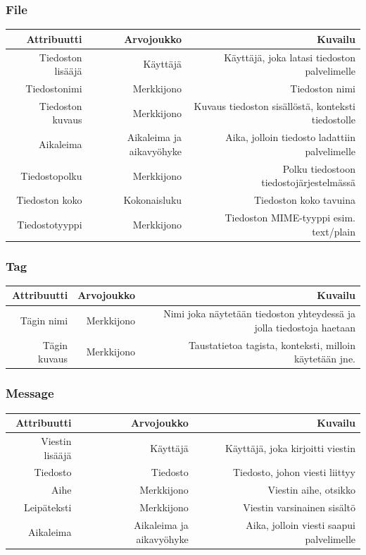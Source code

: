 \documentclass[10pt,a4paper]{article}
\begin{document}
\subsubsection{File}
\begin{tabularx}{\textwidth}{|R|R|R|} \hline
\textbf{Attribuutti} & \textbf{Arvojoukko} & \textbf{Kuvailu}\\ \hline
Tiedoston lisääjä & Käyttäjä & Käyttäjä, joka latasi tiedoston palvelimelle\\ \hline
Tiedostonimi & Merkkijono & Tiedoston nimi\\ \hline
Tiedoston kuvaus & Merkkijono & Kuvaus tiedoston sisällöstä, konteksti tiedostolle\\ \hline
Aikaleima & Aikaleima ja aikavyöhyke & Aika, jolloin tiedosto ladattiin palvelimelle\\ \hline
Tiedostopolku & Merkkijono & Polku tiedostoon tiedostojärjestelmässä\\ \hline
Tiedoston koko & Kokonaisluku & Tiedoston koko tavuina\\ \hline
Tiedostotyyppi & Merkkijono & Tiedoston MIME-tyyppi esim. text/plain\\ \hline
\end{tabularx}

\subsubsection{Tag}
\begin{tabularx}{\textwidth}{|R|R|R|} \hline
\textbf{Attribuutti} & \textbf{Arvojoukko} & \textbf{Kuvailu}\\ \hline
Tägin nimi & Merkkijono & Nimi joka näytetään tiedoston yhteydessä ja jolla tiedostoja haetaan\\ \hline
Tägin kuvaus & Merkkijono & Taustatietoa tagista, konteksti, milloin käytetään jne.\\ \hline
\end{tabularx}

\subsubsection{Message}
\begin{tabularx}{\textwidth}{|R|R|R|} \hline
\textbf{Attribuutti} & \textbf{Arvojoukko} & \textbf{Kuvailu}\\ \hline
Viestin lisääjä & Käyttäjä & Käyttäjä, joka kirjoitti viestin\\ \hline
Tiedosto & Tiedosto & Tiedosto, johon viesti liittyy\\ \hline
Aihe & Merkkijono & Viestin aihe, otsikko\\ \hline
Leipäteksti & Merkkijono & Viestin varsinainen sisältö\\ \hline
Aikaleima & Aikaleima ja aikavyöhyke & Aika, jolloin viesti saapui palvelimelle\\ \hline
\end{tabularx}
\end{document}
